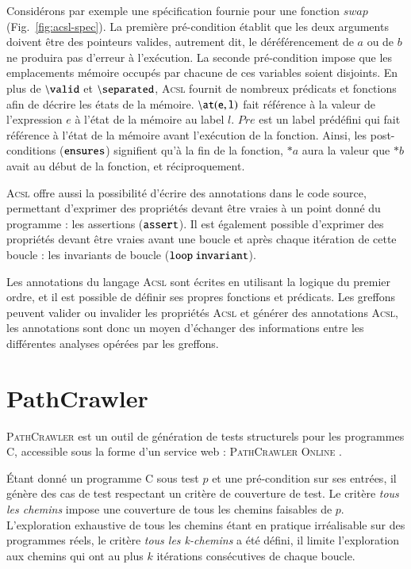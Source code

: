 \documentclass[french]{spimufcphdthesis}
\begin{document}
Considérons par exemple une spécification fournie pour une fonction $swap$
(Fig.~\ref{fig:acsl-spec}). La première pré-condition établit que les deux
arguments doivent être des pointeurs valides, autrement dit, le déréférencement
de $a$ ou de $b$ ne produira pas d'erreur à l'exécution. La seconde
pré-condition impose que les emplacements mémoire occupés par chacune de ces
variables soient disjoints. En plus de ${\tt \backslash valid}$ et
${\tt \backslash separated}$, \textsc{Acsl} fournit de nombreux prédicats et
fonctions afin de décrire les états de la mémoire. ${\tt \backslash at(e,l)}$
fait référence à la valeur de l'expression $e$ à l'état de la mémoire au label
$l$. $Pre$ est un label prédéfini qui fait référence à l'état de la mémoire
avant l'exécution de la fonction. Ainsi, les post-conditions (${\tt ensures}$)
signifient qu'à la fin de la fonction, $*a$ aura la valeur que $*b$ avait au
début de la fonction, et réciproquement.


\textsc{Acsl} offre aussi la possibilité d'écrire des annotations dans le code
source, permettant d'exprimer des propriétés devant être vraies à un point donné
du programme : les assertions (${\tt assert}$).
Il est également possible d'exprimer des propriétés devant être vraies avant une
boucle et après chaque itération de cette boucle : les invariants de boucle
(${\tt loop\ invariant}$).


Les annotations du langage \textsc{Acsl} sont écrites en utilisant la logique
du premier ordre, et il est possible de définir ses propres fonctions et
prédicats.
Les greffons peuvent valider ou invalider les propriétés \textsc{Acsl} et
générer des annotations \textsc{Acsl}, les annotations sont donc un moyen
d'échanger des informations entre les différentes analyses opérées par les
greffons.


\section{PathCrawler}

\textsc{PathCrawler} \cite{PathCrawler} est un outil de génération de tests
structurels pour les programmes C, accessible sous la forme d'un service web :
\textsc{PathCrawler Online} \cite{PathCrawlerOnline}.

Étant donné un programme C sous test $p$ et une pré-condition sur ses entrées,
il génère des cas de test respectant un critère de couverture de test. Le
critère \emph{tous les chemins} impose une couverture de tous les chemins
faisables de $p$. L'exploration exhaustive de tous les chemins étant en pratique
irréalisable sur des programmes réels, le critère \emph{tous les k-chemins} a
été défini, il limite l'exploration aux chemins qui ont au plus $k$ itérations
consécutives de chaque boucle.
\end{document}
